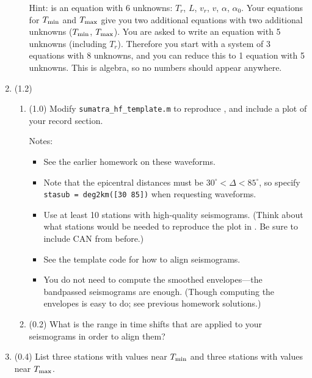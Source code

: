 \documentclass[11pt,titlepage,fleqn]{article}
\begin{document}
\begin{enumerate}
\begin{enumerate}
Hint:  is an equation with 6 unknowns: $T_r$, $L$, $v_r$, $v$, $\alpha$, $\alpha_0$. Your equations for $T_{\rm min}$ and $T_{\rm max}$ give you two additional equations with two additional unknowns ($T_{\rm min}$, $T_{\rm max}$). You are asked to write an equation with 5 unknowns (including $T_r$). Therefore you start with a system of 3 equations with 8 unknowns, and you can reduce this to 1 equation with 5 unknowns. This is algebra, so no numbers should appear anywhere.

\end{enumerate}


\item (1.2) 
\begin{enumerate}
\item (1.0) Modify \verb+sumatra_hf_template.m+ to reproduce \citet[][Figure~1d]{Ni2005}, and include a plot of your record section.

Notes:
%
\begin{itemize}
\item See the earlier homework on these waveforms.

\item Note that the epicentral distances must be $30^\circ < \Delta < 85^\circ$, so specify \\
\verb+stasub = deg2km([30 85])+ when requesting waveforms.

\item Use at least 10 stations with high-quality seismograms. (Think about what stations would be needed to reproduce the plot in \citet{Ni2005}. Be sure to include CAN from before.)

\item See the template code for how to align seismograms.

\item You do not need to compute the smoothed envelopes---the bandpassed seismograms are enough. (Though computing the envelopes is easy to do; see previous homework solutions.) 
\end{itemize}

\item (0.2) What is the range in time shifts that are applied to your seismograms in order to align them?

\end{enumerate}


\item (0.4) List three stations with values near $T_{\rm min}$ and three stations with values near $T_{\rm max}$.


\end{enumerate}
\end{document}
